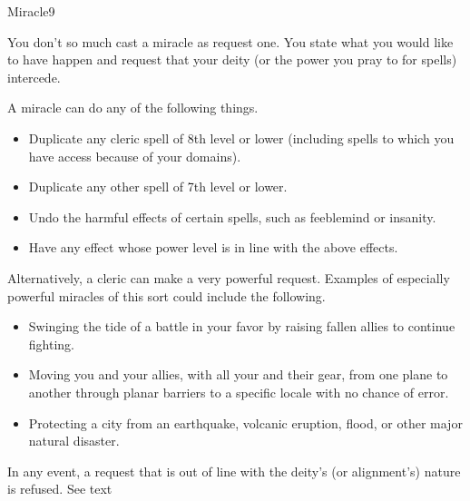 \begin{spellsection}{Miracle}{9}
\begin{spellheader}
\end{spellheader}
\begin{spellcontent}
    \begin{spelltargetinginfo}
    \end{spelltargetinginfo}
    \begin{spelleffects}
        \spelleffect You don't so much cast a miracle as request one. You state what you would like to have happen and request that your deity (or the power you pray to for spells) intercede.
        \par A miracle can do any of the following things.
        \begin{itemize}
            \item Duplicate any cleric spell of 8th level or lower (including spells to which you have access because of your domains). 
            \item Duplicate any other spell of 7th level or lower.
            \item Undo the harmful effects of certain spells, such as feeblemind or insanity.
            \item Have any effect whose power level is in line with the above effects.
        \end{itemize}
        \par Alternatively, a cleric can make a very powerful request. Examples of especially powerful miracles of this sort could include the following.
        \begin{itemize}
            \item Swinging the tide of a battle in your favor by raising fallen allies to continue fighting.
            \item Moving you and your allies, with all your and their gear, from one plane to another through planar barriers to a specific locale with no chance of error.
            \item Protecting a city from an earthquake, volcanic eruption, flood, or other major natural disaster.
        \end{itemize}
        \par In any event, a request that is out of line with the deity's (or alignment's) nature is refused.
        \spelldur See text
    \end{spelleffects}

\end{spellcontent}
\end{spellsection}
